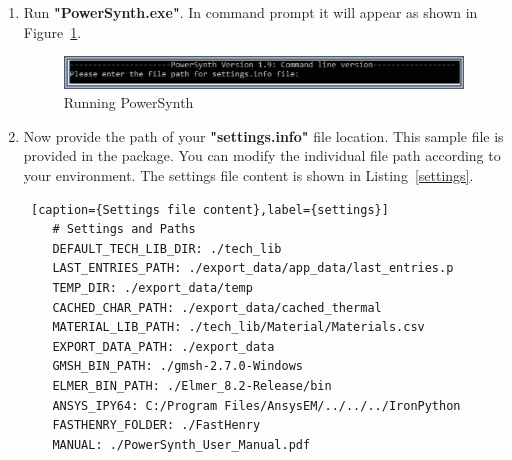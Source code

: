 \documentclass[11pt]{article}
\begin{document}
\begin{enumerate}
    \item Run \textbf{"PowerSynth.exe"}. In command prompt it will appear as shown in Figure~\ref{macro_5}.
    
    \begin{figure}[H]
    \centering
    \includegraphics[width=\linewidth ]{figs/v_1.9_figs/cmd_re_1.eps}
    \caption{Running PowerSynth}
    \label{macro_5}
    \end{figure} 
    
    \item Now provide the path of your \textbf{"settings.info"} file location. This sample file is provided in the package. You can modify the individual file path according to your environment. The settings file content is shown in Listing~\ref{settings}.

    
    \begin{lstlisting} [caption={Settings file content},label={settings}]
    # Settings and Paths
    DEFAULT_TECH_LIB_DIR: ./tech_lib
    LAST_ENTRIES_PATH: ./export_data/app_data/last_entries.p
    TEMP_DIR: ./export_data/temp
    CACHED_CHAR_PATH: ./export_data/cached_thermal
    MATERIAL_LIB_PATH: ./tech_lib/Material/Materials.csv
    EXPORT_DATA_PATH: ./export_data
    GMSH_BIN_PATH: ./gmsh-2.7.0-Windows
    ELMER_BIN_PATH: ./Elmer_8.2-Release/bin
    ANSYS_IPY64: C:/Program Files/AnsysEM/../../../IronPython
    FASTHENRY_FOLDER: ./FastHenry
    MANUAL: ./PowerSynth_User_Manual.pdf


\end{lstlisting}
\end{enumerate}
\end{document}
